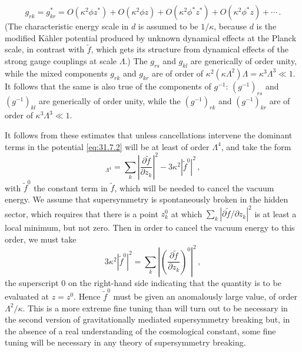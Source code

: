 \begin{equation}
  g_{rk}=g_{kr}^*
  =O(\kappa^2\phi z^*)+O(\kappa^2\phi z)
   +O(\kappa^2\phi^*z^*)+O(\kappa^2\phi^*z)+\cdots\,.
  \tag{31.7.6}\label{eq:31.7.6}
\end{equation}
(The characteristic energy scale in \(d\) is assumed to be \(1/\kappa\),
because \(d\) is the modified Kähler potential produced by unknown
dynamical effects at the Planck scale, in contrast with \(\widetilde f\),
which gets its structure from dynamical effects of the strong gauge
couplings at scale \(\Lambda\).) The \(g_{rs}\) and \(g_{kl}\) are
generically of order unity, while the mixed components \(g_{rk}\) and
\(g_{kr}\) are of order of
\(\kappa^2(\kappa\Lambda^2)\Lambda=\kappa^3\Lambda^3\ll1\). It follows
that the same is also true of the components of \(g^{-1}\):
\((g^{-1})_{rs}\) and \((g^{-1})_{kl}\) are generically of order unity,
while the \((g^{-1})_{rk}\) and \((g^{-1})_{kr}\) are of order of
\(\kappa^3\Lambda^3\ll1\).

It follows from these estimates that unless cancellations intervene the
dominant terms in the potential \eqref{eq:31.7.2} will be at least of order
\(\Lambda^4\), and take the form
\begin{equation}
  [V]_{\Lambda^4}
  =\sum_k\left|\frac{\partial\widetilde f}{\partial z_k}\right|^2
   -3\kappa^2|\widetilde f^0|^2\,,
  \tag{31.7.7}\label{eq:31.7.7}
\end{equation}
with \(\widetilde f^0\) the constant term in \(\widetilde f\), which will be
needed to cancel the vacuum energy. We assume that supersymmetry is
spontaneously broken in the hidden sector, which requires that there is a
point \(z_k^0\) at which
\(\sum_k|\partial\widetilde f/\partial z_k|^2\) is at least a local minimum,
but not zero. Then in order to cancel the vacuum energy to this order, we
must take
\begin{equation}
  3\kappa^2|\widetilde f^0|^2
  =\sum_k\left|
    \left(\frac{\partial\widetilde f}{\partial z_k}\right)^0
  \right|^2\,,
  \tag{31.7.8}\label{eq:31.7.8}
\end{equation}
the superscript 0 on the right-hand side indicating that the quantity is to
be evaluated at \(z=z^0\). Hence \(\widetilde f^0\) must be given an
anomalously large value, of order \(\Lambda^2/\kappa\). This is a more
extreme fine tuning than will turn out to be necessary in the second
version of gravitationally mediated supersymmetry breaking but, in the
absence of a real understanding of the cosmological constant, some fine
tuning will be necessary in any theory of supersymmetry breaking.

